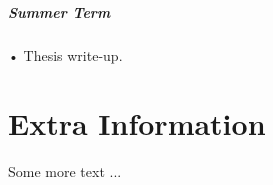 \documentclass[withindex,glossary]{cam-thesis}
\begin{document}

\paragraph{Summer Term}

• Thesis write-up.


%

\renewcommand{\bibname}{References}
\cleardoublepage
{}
{}






\appendix

\chapter{Extra Information}
Some more text ...



\printthesisindex
\end{document}
